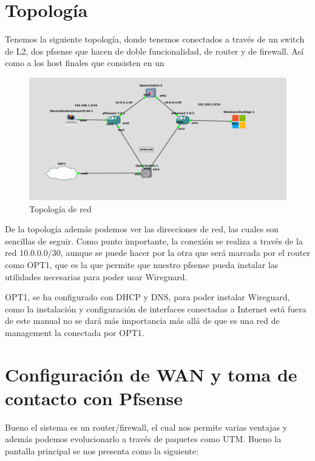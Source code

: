 
\section{Topología}

Tenemos la siguiente topología, donde tenemos conectados a través de un switch de L2, dos pfsense que hacen de doble funcionalidad, de router y de firewall. Así como a los host finales que consisten en un

\begin{figure}[H]
	\centering
	\includegraphics[scale=0.30]{00}
	\caption{Topología de red}
\end{figure}

De la topología además podemos ver las direcciones de red, las cuales son sencillas de seguir. Como punto importante, la conexión se realiza a través de la red 10.0.0.0/30, aunque se puede hacer por la otra que será marcada por el router como OPT1, que es la que permite que nuestro pfsense pueda instalar las utilidades necesarias para poder usar Wireguard. 
\vspace{5mm}

OPT1, se ha configurado con DHCP y DNS, para poder instalar Wireguard, como la instalación y configuración de interfaces conectadas a Internet está fuera de este manual no se dará más importancia más allá de que es una red de management la conectada por OPT1.

\newpage
\section{Configuración de WAN y toma de contacto con Pfsense}

Bueno el sistema es un router/firewall, el cual nos permite varias ventajas y además podemos evolucionarlo a través de paquetes como UTM. Bueno la pantalla principal se nos presenta como la siguiente:

